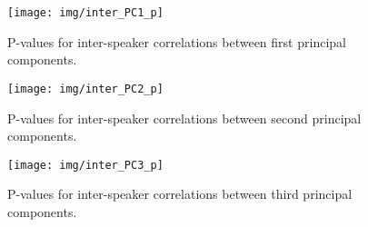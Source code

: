 \begin{figure}[H]
    \centering
    \texttt{[image: img/inter\_PC1\_p]}
    \caption{P-values for inter-speaker correlations between first principal components.}
    \label{fig:inter_PC1_p}
\end{figure}

\begin{figure}[H]
    \centering
    \texttt{[image: img/inter\_PC2\_p]}
    \caption{P-values for inter-speaker correlations between second principal components.}
    \label{fig:inter_PC2_p}
\end{figure}

\begin{figure}[H]
    \centering
    \texttt{[image: img/inter\_PC3\_p]}
    \caption{P-values for inter-speaker correlations between third principal components.}
    \label{fig:inter_PC3_p}
\end{figure}
